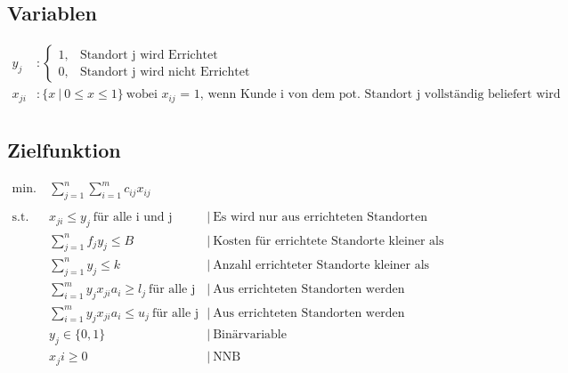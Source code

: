 \documentclass[a4paper,11pt]{article}
\begin{document}
\subsection*{Variablen}
\begin{align*}
    y_j &: \begin{cases}
        1, & \text{Standort j wird Errichtet} \\
        0, & \text{Standort j wird nicht Errichtet}
    \end{cases} \\
    x_{ji} &: \{ x ~|~ 0 \le x \le 1 \} ~\text{wobei $x_{ij}$ = 1, wenn Kunde i von dem pot. Standort j vollständig beliefert wird} \\
\end{align*}

\subsection*{Zielfunktion}
\begin{align*}
    \text{min.} ~& \sum_{j=1}^{n}\sum_{i=1}^{m}c_{ij} x_{ij} \\
    ~\\
    \text{s.t.} ~& x_{ji} \le y_j ~\text{für alle i und j} &&|~ \text{Es wird nur aus errichteten Standorten geliefert}  \\
    & \sum_{j=1}^{n} f_j y_j \le B &&|~ \text{Kosten für errichtete Standorte kleiner als obere Schranke B} \\
    & \sum_{j=1}^{n} y_j \le k &&|~ \text{Anzahl errichteter Standorte kleiner als Höchstzahl k} \\
    & \sum_{i=1}^{m} y_j x_{ji} a_i \ge l_j ~\text{für alle j} &&|~ \text{Aus errichteten Standorten werden mindestens l Kunden beliefert} \\
    & \sum_{i=1}^{m} y_j x_{ji} a_i \le u_j ~\text{für alle j} &&|~ \text{Aus errichteten Standorten werden höchstens u Kunden beliefert} \\
    & y_j \in \{0, 1\} &&|~ \text{Binärvariable} \\
    & x_ji \ge 0 &&|~ \text{NNB} \\
\end{align*}
\end{document}
